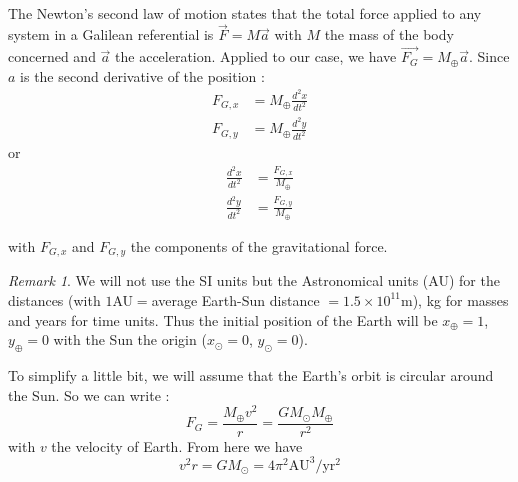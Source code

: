 \documentclass[a4paper, twoside, 11pt]{report}
\theoremstyle{theorem}
\theoremstyle{remark}
\newtheorem{remark}{Remark}[chapter]
\theoremstyle{exemple}
\begin{document}
            \paragraph{}The Newton's second law of motion states that the total force applied to any system in a Galilean referential is $\overrightarrow{F}=M\overrightarrow{a}$ with $M$ the mass of the body concerned and $\overrightarrow {a}$ the acceleration. Applied to our case, we have $\overrightarrow{{F}_{G}} = {M}_{\oplus} \overrightarrow{a}$. Since $a$ is the second derivative of the position : 
                \begin{align*}
                    F_{G,x} &= M_{\oplus} \frac{d^2 x}{dt^2} \\
                    F_{G,y} &= M_{\oplus} \frac{d^2 y}{dt^2}
                \end{align*}
            or
                \begin{align}
                    \frac{d^2 x}{dt^2} &= \frac{F_{G,x}}{M_{\oplus}} \tag{2}\\
                    \frac{d^2 y}{dt^2} &= \frac{F_{G,y}}{M_{\oplus}} \tag{3}
                \end{align}
                
            with $F_{G,x}$ and $F_{G,y}$ the components of the gravitational force.\\
            \begin{remark}
            	We will not use the SI units but the Astronomical units (AU) for the distances (with $1$AU$ = $average Earth-Sun distance $=1.5 \times 10^{11}$m), kg for masses and years for time units. Thus the initial position of the Earth will be $x_{\oplus} = 1$, \hspace{0,1cm}$y_{\oplus} = 0$ with the Sun the origin ($x_{\odot} = 0$, $y_{\odot} = 0$). 

			\end{remark}
            To simplify a little bit, we will assume that the Earth's orbit is circular around the Sun. So we can write :
                \begin{equation}
                    F_G = \frac{M_{\oplus} v^2}{r} = \frac{GM_{\odot}M_{\oplus}}{r^2}
                    \tag{4}
                \end{equation}
            with $v$ the velocity of Earth. From here we have
                \begin{equation*}
                    v^2 r = GM_{\odot} = 4 \pi^2 \mathrm{AU}^3 / \mathrm{yr}^2
                    \tag{5}
                \end{equation*}
            
\end{document}
